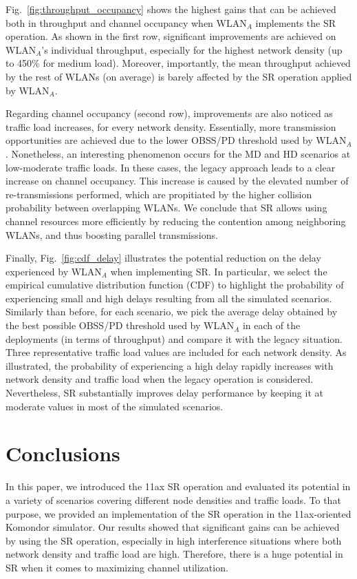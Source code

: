 \documentclass{article}
\begin{document}
	Fig.~\ref{fig:throughput_occupancy} shows the highest gains that can be achieved both in throughput and channel occupancy when WLAN$_A$ implements the SR operation. As shown in the first row, significant improvements are achieved on WLAN$_A$'s individual throughput, especially for the highest network density (up to 450\% for medium load). Moreover, importantly, the mean throughput achieved by the rest of WLANs (on average) is barely affected by the SR operation applied by WLAN$_A$.
	
	Regarding channel occupancy (second row), improvements are also noticed as traffic load increases, for every network density. Essentially, more transmission opportunities are achieved due to the lower OBSS/PD threshold used by WLAN$_A$. Nonetheless, an interesting phenomenon occurs for the MD and HD scenarios at low-moderate traffic loads. In these cases, the legacy approach leads to a clear increase on channel occupancy. This increase is caused by the elevated number of re-transmissions performed, which are propitiated by the higher collision probability between overlapping WLANs. We conclude that SR allows using channel resources more efficiently by reducing the contention among neighboring WLANs, and thus boosting parallel transmissions.
	
	Finally, Fig.~\ref{fig:cdf_delay} illustrates the potential reduction on the delay experienced by WLAN$_A$ when implementing SR. In particular, we select the empirical cumulative distribution function (CDF) to highlight the probability of experiencing small and high delays resulting from all the simulated scenarios. Similarly than before, for each scenario, we pick the average delay obtained by the best possible OBSS/PD threshold used by WLAN$_A$ in each of the deployments (in terms of throughput) and compare it with the legacy situation. Three representative traffic load values are included for each network density. As illustrated, the probability of experiencing a high delay rapidly increases with network density and traffic load when the legacy operation is considered. Nevertheless, SR substantially improves delay performance by keeping it at moderate values in most of the simulated scenarios.

	\section{Conclusions}
	In this paper, we introduced the 11ax SR operation and evaluated its potential in a variety of scenarios covering different node densities and traffic loads. To that purpose, we provided an implementation of the SR operation in the 11ax-oriented Komondor simulator. Our results showed that significant gains can be achieved by using the SR operation, especially in high interference situations where both network density and traffic load are high. Therefore, there is a huge potential in SR when it comes to maximizing channel utilization.
	
\end{document}
